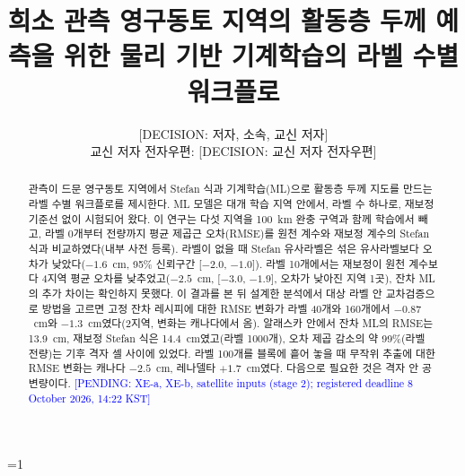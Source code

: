 \providecommand{\frontblock}{0}

\ifnum\frontblock=1\relax
\title{희소 관측 영구동토 지역의 활동층 두께 예측을 위한 물리 기반 기계학습의 라벨 수별 워크플로}
\author{[DECISION: 저자, 소속, 교신 저자]\\{\small 교신 저자 전자우편: [DECISION: 교신 저자 전자우편]}}
\date{}
\maketitle

\begin{abstract}
\noindent 관측이 드문 영구동토 지역에서 Stefan 식과 기계학습(ML)으로 활동층 두께 지도를 만드는 라벨 수별 워크플로를 제시한다. ML 모델은 대개 학습 지역 안에서, 라벨 수 하나로, 재보정 기준선 없이 시험되어 왔다. 이 연구는 다섯 지역을 100~km 완충 구역과 함께 학습에서 빼고, 라벨 0개부터 전량까지 평균 제곱근 오차(RMSE)를 원천 계수와 재보정 계수의 Stefan 식과 비교하였다(내부 사전 등록). 라벨이 없을 때 Stefan 유사라벨은 섞은 유사라벨보다 오차가 낮았다($-1.6$~cm, 95\% 신뢰구간 [$-2.0$, $-1.0$]). 라벨 10개에서는 재보정이 원천 계수보다 4지역 평균 오차를 낮추었고($-2.5$~cm, [$-3.0$, $-1.9$], 오차가 낮아진 지역 1곳), 잔차 ML의 추가 차이는 확인하지 못했다. 이 결과를 본 뒤 설계한 분석에서 대상 라벨 안 교차검증으로 방법을 고르면 고정 잔차 레시피에 대한 RMSE 변화가 라벨 40개와 160개에서 $-0.87$~cm와 $-1.3$~cm였다(2지역, 변화는 캐나다에서 옴). 알래스카 안에서 잔차 ML의 RMSE는 13.9~cm, 재보정 Stefan 식은 14.4~cm였고(라벨 1000개), 오차 제곱 감소의 약 99\%(라벨 전량)는 기후 격자 셀 사이에 있었다. 라벨 100개를 블록에 흩어 놓을 때 무작위 추출에 대한 RMSE 변화는 캐나다 $-2.5$~cm, 레나델타 $+1.7$~cm였다. 다음으로 필요한 것은 격자 안 공변량이다. \textcolor{blue}{[PENDING: XE-a, XE-b, satellite inputs (stage 2); registered deadline 8 October 2026, 14:22 KST]}
\end{abstract}

